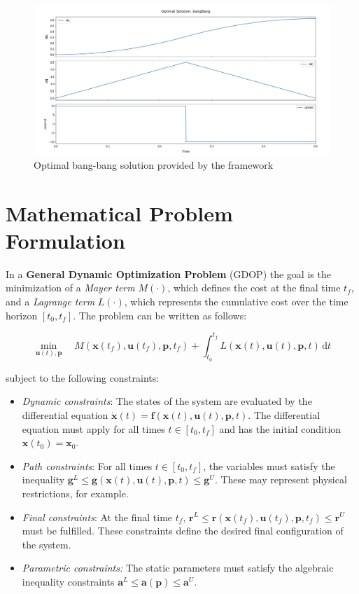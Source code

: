 \documentclass[12pt]{article}
\newcommand{\dd}{\mathrm{d}}
\renewcommand{\v}{\bm}
\begin{document}
\begin{figure}[H]
	\centering
	\includegraphics[width=\textwidth]{images/bangBang.png}
	\caption{Optimal bang-bang solution provided by the framework}
	\label{fig:bangBang}
\end{figure}
\section{Mathematical Problem Formulation}
\label{c:GDOP}

In a \textbf{General Dynamic Optimization Problem} (GDOP) the goal is the minimization of a \textit{Mayer term} $M(\cdot)$, which defines the cost at the final time $t_f$, and a \textit{Lagrange term} $L(\cdot)$, which represents the cumulative cost over the time horizon $[t_0, t_f]$. The problem can be written as follows:

\begin{equation*}
\min_{\v{u}(t), \v{p}} \quad M(\v{x}(t_f), \v{u}(t_f), \v{p}, t_f) + \int_{t_0}^{t_f} L(\v{x}(t), \v{u}(t), \v{p}, t)\, \dd t
\end{equation*}

subject to the following constraints:

\begin{itemize}
	\item \textit{Dynamic constraints}:  
	The states of the system are evaluated by the differential equation $\dot{\v{x}}(t) = \v{f}(\v{x}(t), \v{u}(t), \v{p}, t)$. The differential equation must apply for all times $t \in [t_0, t_f]$ and has the initial condition $\v{x}(t_0) = \v{x}_0$.
	
	\item \textit{Path constraints}:  
	For all times $t \in [t_0, t_f]$, the variables must satisfy the inequality $\v{g}^L \leq \v{g}(\v{x}(t), \v{u}(t), \v{p}, t) \leq \v{g}^U$. These may represent physical restrictions, for example.
	
	\item \textit{Final constraints}:  
	At the final time $t_f$, $\v{r}^L \leq \v{r}(\v{x}(t_f), \v{u}(t_f), \v{p}, t_f) \leq \v{r}^U$ must be fulfilled. These constraints define the desired final configuration of the system.
	
	\item \textit{Parametric constraints:}  
	The static parameters must satisfy the algebraic inequality constraints $\v{a}^L \leq \v{a}(\v{p}) \leq \v{a}^U$.
\end{itemize}
\end{document}

